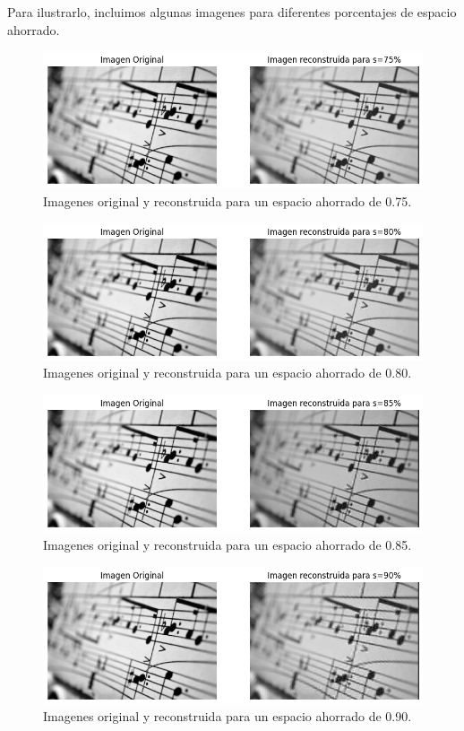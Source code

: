 \documentclass[a4paper,12pt]{article}
\numberwithin{equation}{section}
\numberwithin{figure}{section}
\begin{document}
Para ilustrarlo, incluimos algunas imagenes para diferentes porcentajes de espacio ahorrado. 
\begin{figure}[H]
    \centering
    \includegraphics[width=1\textwidth]{Ejercicio 4b75.png}
    \caption{Imagenes original y reconstruida para un espacio ahorrado de 0.75.}
    \label{fig:ej4b1}
\end{figure}
\begin{figure}[H]
    \centering
    \includegraphics[width=1\textwidth]{Ejercicio 4b80.png}
    \caption{Imagenes original y reconstruida para un espacio ahorrado de 0.80.}
    \label{fig:ej4b2}
\end{figure}
\begin{figure}[H]
    \centering
    \includegraphics[width=1\textwidth]{Ejercicio 4b85.png}
    \caption{Imagenes original y reconstruida para un espacio ahorrado de 0.85.}
    \label{fig:ej4b3}
\end{figure}
\begin{figure}[H]
    \centering
    \includegraphics[width=1\textwidth]{Ejercicio 4b90.png}
    \caption{Imagenes original y reconstruida para un espacio ahorrado de 0.90.}
    \label{fig:ej4b4}
\end{figure}
\end{document}
